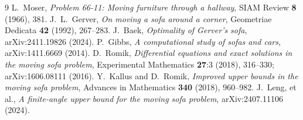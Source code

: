 \documentclass[11pt]{article}
\begin{document}
\begin{thebibliography}{9}
 L.~Moser, \emph{Problem 66-11: Moving furniture through a hallway}, SIAM Review \textbf{8} (1966), 381.
 J.~L.~Gerver, \emph{On moving a sofa around a corner}, Geometriae Dedicata \textbf{42} (1992), 267--283.
 J.~Baek, \emph{Optimality of Gerver's sofa}, arXiv:2411.19826 (2024).
 P.~Gibbs, \emph{A computational study of sofas and cars}, arXiv:1411.6669 (2014).
 D.~Romik, \emph{Differential equations and exact solutions in the moving sofa problem}, Experimental Mathematics \textbf{27}:3 (2018), 316--330; arXiv:1606.08111 (2016).
 Y.~Kallus and D.~Romik, \emph{Improved upper bounds in the moving sofa problem}, Advances in Mathematics \textbf{340} (2018), 960--982.
 J.~Leng, et al., \emph{A finite-angle upper bound for the moving sofa problem}, arXiv:2407.11106 (2024).
\end{thebibliography}
\end{document}
